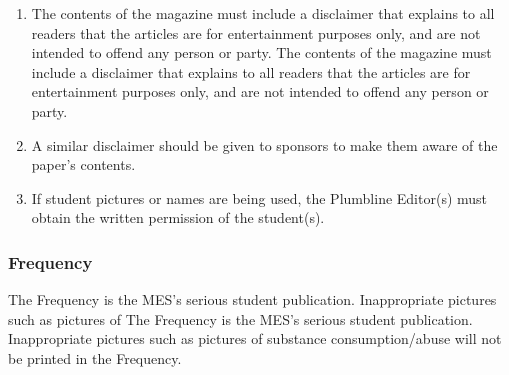 \begin{enumerate}
  \begin{enumerate}
   \item
    The contents of the magazine must include a disclaimer that explains to all readers that the articles are for entertainment purposes only, and are not intended to offend any person or party.
    The contents of the magazine must include a disclaimer that explains to all readers that the articles are for entertainment purposes only, and are not intended to offend any person or party.
   \item
    A similar disclaimer should be given to sponsors to make them aware of the paper's contents.
   \item
    If student pictures or names are being used, the Plumbline Editor(s) must obtain the written permission of the student(s).

  \end{enumerate}
\end{enumerate}

\subsubsection{Frequency}
\label{frequency}
The Frequency is the MES's serious student publication. Inappropriate pictures such as pictures of
The Frequency is the MES's serious student publication. Inappropriate pictures such as pictures of
substance consumption/abuse will not be printed in the Frequency.

